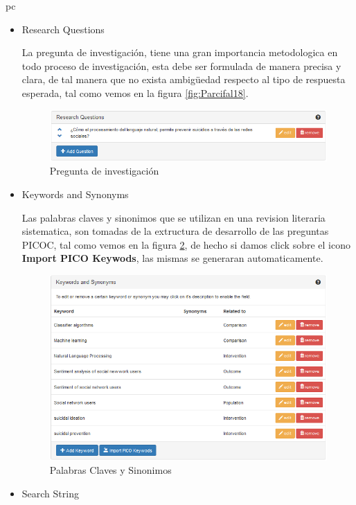 pc\documentclass[a4paper,12pt,openany]{book}
\begin{document}
\begin{itemize}
\begin{itemize}
\begin{itemize}
\item Research Questions

La pregunta de investigación, tiene una gran importancia metodologica en todo proceso de investigación, esta debe ser formulada de manera precisa y clara, de tal manera que no exista ambigüedad respecto al tipo de respuesta esperada, tal como vemos en la figura \ref{fig:Parcifal18}.   

    \begin{figure}[H]
    \centering
	\includegraphics[width=12cm]{parsifal8.png}
    \caption{Pregunta de investigación}
    \label{fig:Parcifal8}
    \end{figure}

\item Keywords and Synonyms 

Las palabras claves y sinonimos que se utilizan en una revision literaria sistematica, son tomadas de la extructura de desarrollo de las preguntas PICOC, tal como vemos en la figura \ref{fig:Parcifal9}, de hecho si damos click sobre el icono \textbf{Import PICO Keywods}, las mismas se generaran automaticamente.  

    \begin{figure}[H]
    \centering
	\includegraphics[width=12cm]{parsifal9.png}
    \caption{Palabras Claves y Sinonimos}
    \label{fig:Parcifal9}
    \end{figure}

\item Search String


\end{itemize}
\end{itemize}
\end{itemize}
\end{document}
